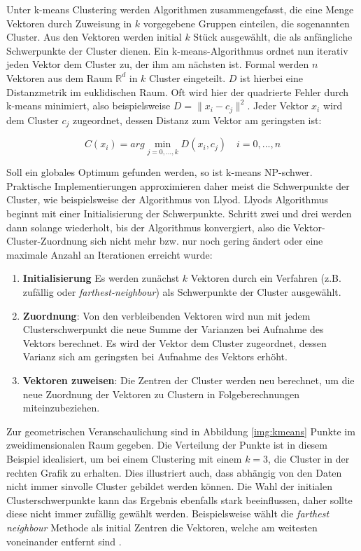 Unter k-means Clustering werden Algorithmen zusammengefasst, die eine Menge Vektoren durch Zuweisung in $k$ vorgegebene Gruppen einteilen, die sogenannten Cluster. Aus den Vektoren werden initial $k$ Stück ausgewählt, die als anfängliche Schwerpunkte der Cluster dienen. Ein k-means-Algorithmus ordnet nun iterativ jeden Vektor dem Cluster zu, der ihm am nächsten ist. Formal werden $n$ Vektoren aus dem Raum $\mathbb{R}^{d}$ in $k$ Cluster eingeteilt. $D$ ist hierbei eine Distanzmetrik im euklidischen Raum. Oft wird hier der quadrierte Fehler durch k-means minimiert, also beispielsweise $D = \|x_{i} - c_{j}\|^{2}$. Jeder Vektor $x_{i}$ wird dem Cluster $c_{j}$ zugeordnet, dessen Distanz zum Vektor am geringsten ist:

$$ C(x_i) = arg \min_{j = 0,...,k} D(x_i, c_j) \quad i = 0,...,n$$

Soll ein globales Optimum gefunden werden, so ist k-means NP-schwer. Praktische Implementierungen approximieren daher meist die Schwerpunkte der Cluster, wie beispielsweise der Algorithmus von Llyod. Llyods Algorithmus beginnt mit einer Initialisierung der Schwerpunkte. Schritt zwei und drei werden dann solange wiederholt, bis der Algorithmus konvergiert, also die Vektor-Cluster-Zuordnung sich nicht mehr bzw. nur noch gering ändert oder eine maximale Anzahl an Iterationen erreicht wurde: 

\begin{enumerate}
	\item \textbf{Initialisierung} Es werden zunächst $k$ Vektoren durch ein Verfahren (z.B. zufällig oder \textit{farthest-neighbour}) als Schwerpunkte der Cluster ausgewählt.
	\item \textbf{Zuordnung}: Von den verbleibenden Vektoren wird nun mit jedem Clusterschwerpunkt die neue Summe der Varianzen bei Aufnahme des Vektors berechnet. Es wird der Vektor dem Cluster zugeordnet, dessen Varianz sich am geringsten bei Aufnahme des Vektors erhöht.
	\item \textbf{Vektoren zuweisen}: Die Zentren der Cluster werden neu berechnet, um die neue Zuordnung der Vektoren zu Clustern in Folgeberechnungen miteinzubeziehen.
\end{enumerate}

Zur geometrischen Veranschaulichung sind in Abbildung \ref{img:kmeans} Punkte im zweidimensionalen Raum gegeben. Die Verteilung der Punkte ist in diesem Beispiel idealisiert, um bei einem Clustering mit einem $k = 3$, die Cluster in der rechten Grafik zu erhalten. Dies illustriert auch, dass abhängig von den Daten nicht immer sinvolle Cluster gebildet werden können. Die Wahl der initialen Clusterschwerpunkte kann das Ergebnis ebenfalls stark beeinflussen, daher sollte diese nicht immer zufällig gewählt werden. Beispielsweise wählt die \textit{farthest neighbour} Methode als initial Zentren die Vektoren, welche am weitesten voneinander entfernt sind \cite{mmd2011}.

